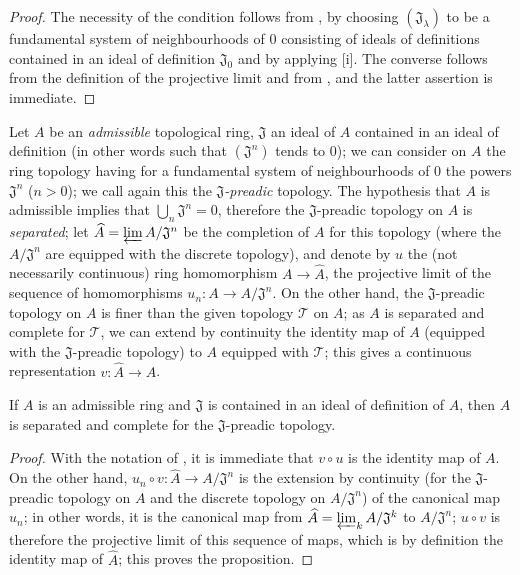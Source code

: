 \begin{proof}
The necessity of the condition follows from , by choosing
$(\mathfrak{J}_\lambda)$ to be a fundamental system of neighbourhoods of $0$
consisting of ideals of definitions contained in an ideal of definition
$\mathfrak{J}_0$ and by applying [i]. The converse follows
from the definition of the projective limit and from , and the
latter assertion is immediate.
\end{proof}

\begin{env}[7.2.3]
\label{0.7.2.3}
Let $A$ be an \emph{admissible} topological ring, $\mathfrak{J}$ an ideal of $A$
contained in an ideal of definition (in other words  such that
$(\mathfrak{J}^n)$ tends to $0$); we can consider on $A$ the ring topology
having for a fundamental system of neighbourhoods of $0$ the powers
$\mathfrak{J}^n$ ($n>0$); we call again this the \emph{$\mathfrak{J}$-preadic}
topology. The hypothesis that $A$ is admissible implies that
$\bigcup_n\mathfrak{J}^n=0$, therefore the $\mathfrak{J}$-preadic topology on
$A$ is \emph{separated}; let $\widehat{A}=\varprojlim A/\mathfrak{J}^n$ be the
completion of $A$ for this topology (where the $A/\mathfrak{J}^n$ are equipped
with the discrete topology), and denote by $u$ the (not necessarily continuous)
ring homomorphism $A\to\widehat{A}$, the projective limit of the sequence of
homomorphisms $u_n:A\to A/\mathfrak{J}^n$. On the other hand, the
$\mathfrak{J}$-preadic topology on $A$ is finer than the given topology
$\mathcal{T}$ on $A$; as $A$ is separated and complete for $\mathcal{T}$, we can
extend by continuity the identity map of $A$ (equipped with the
$\mathfrak{J}$-preadic topology) to $A$ equipped with $\mathcal{T}$; this
gives a continuous representation $v:\widehat{A}\to A$.
\end{env}

\begin{proposition}[7.2.4]
\label{0.7.2.4}
If $A$ is an admissible ring and $\mathfrak{J}$ is contained in an ideal of
definition of $A$, then $A$ is separated and complete for the
$\mathfrak{J}$-preadic topology.
\end{proposition}

\begin{proof}
With the notation of , it is immediate that
$v\circ u$ is the identity map of $A$. On the other hand,
$u_n\circ v:\widehat{A}\to A/\mathfrak{J}^n$ is the extension by continuity (for
the $\mathfrak{J}$-preadic topology on $A$ and the discrete topology on
$A/\mathfrak{J}^n$) of the canonical map $u_n$; in other words, it is the
canonical map from $\widehat{A}=\varprojlim_k A/\mathfrak{J}^k$ to
$A/\mathfrak{J}^n$; $u\circ v$ is therefore the projective limit of this
sequence of maps, which is by definition the identity map of
$\widehat{A}$; this proves the proposition.
\end{proof}

